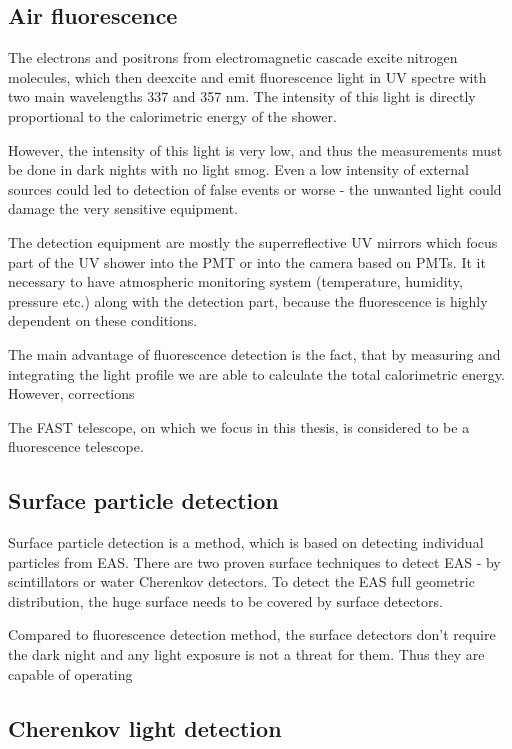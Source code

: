 \subsection{Air fluorescence}
The electrons and positrons from electromagnetic cascade excite nitrogen molecules, which then deexcite and emit fluorescence light in UV spectre with two main wavelengths 337 and 357 nm. The intensity of this light is directly proportional to the calorimetric energy of the shower.
\par
However, the intensity of this light is very low, and thus the measurements must be done in dark nights with no light smog. Even a low intensity of external sources could led to detection of false events or worse - the unwanted light could damage the very sensitive equipment. 
\par
The detection equipment are mostly the superreflective UV mirrors which focus part of the UV shower into the PMT or into the camera based on PMTs. It it necessary to have atmospheric monitoring system (temperature, humidity, pressure etc.) along with the detection part, because the fluorescence is highly dependent on these conditions.  
\par
The main advantage of fluorescence detection is the fact, that by measuring and integrating the light profile we are able to calculate the total calorimetric energy. However, corrections   

\par
The FAST telescope, on which we focus in this thesis, is considered to be a fluorescence telescope.
\subsection{Surface particle detection}
Surface particle detection is a method, which is based on detecting individual particles from EAS. There are two proven surface techniques to detect EAS - by scintillators or water Cherenkov detectors. To detect the EAS full geometric distribution, the huge surface needs to be covered by surface detectors. 


\par
Compared to fluorescence detection method, the surface detectors don't require the dark night and any light exposure is not a threat for them. Thus they are capable of operating 



\subsection{Cherenkov light detection}


